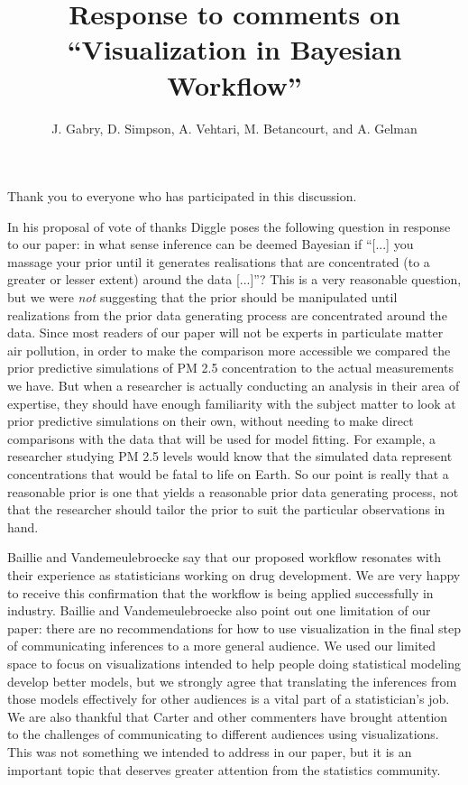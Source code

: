 \documentclass{article}
\title{Response to comments on ``Visualization in Bayesian Workflow''}
\author{J. Gabry, D. Simpson, A. Vehtari, M. Betancourt, and A. Gelman}
\begin{document}
\maketitle

Thank you to everyone who has participated in this discussion. 

In his proposal of vote of thanks Diggle poses the following question in
response to our paper: in what sense inference can be deemed Bayesian if ``[...]
you massage your prior until it generates realisations that are concentrated (to
a greater or lesser extent) around the data [...]''?  This is a very reasonable
question, but we were \emph{not} suggesting that the prior should be manipulated
until  realizations from the prior data generating process are concentrated
around the data.  Since most readers of our paper will not be experts in
particulate matter air pollution, in order to make the comparison more accessible
we compared the prior predictive simulations of PM 2.5 concentration to the actual 
measurements we have.  But when a researcher is actually
conducting an analysis in their area of expertise, they should  have enough
familiarity with the subject matter to look at prior predictive simulations on
their own, without needing to make direct comparisons with the data that will
be used for model fitting. For example, a researcher studying PM 2.5 
levels would know that the simulated data represent concentrations that 
would be fatal to life on Earth. So our point is really that a reasonable prior is
one that yields a reasonable prior data generating process, not that the
researcher should tailor the prior to suit the particular observations in hand.

Baillie and Vandemeulebroecke say that our proposed workflow resonates with
their experience as statisticians working on drug development. We are very happy
to receive this confirmation that the workflow is being applied  successfully in
industry. Baillie and Vandemeulebroecke also point out one limitation of our
paper: there are no recommendations for how to use visualization in the final
step of communicating inferences to a more general audience. We used our limited
space to focus on visualizations intended to help people doing statistical
modeling develop better models,  but we strongly agree that translating the
inferences from those models effectively for other audiences is a vital part of
a  statistician's job. We are also thankful that Carter and other commenters
have brought attention to the challenges of  communicating to different
audiences using visualizations. This was not something we intended to address in
our paper, but  it is an important topic that deserves greater attention from
the statistics community.
\end{document}
